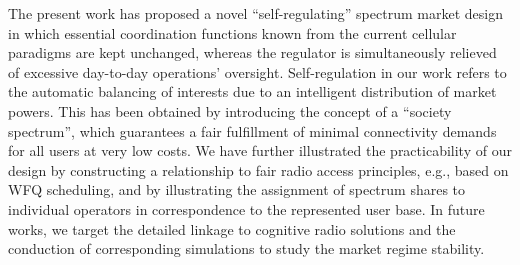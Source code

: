 \documentclass[conference]{IEEEtran}
\begin{document}
The present work has proposed a novel ``self-regulating'' spectrum market design in which essential coordination functions known from the current cellular paradigms are kept unchanged, whereas the regulator is simultaneously relieved of excessive day-to-day operations' oversight. Self-regulation in our work refers to the automatic balancing of interests due to an intelligent distribution of market powers. This has been obtained by introducing the concept of a ``society spectrum'', which guarantees a fair fulfillment of minimal connectivity demands for all users at very low costs. We have further illustrated the practicability of our design by constructing a relationship to fair radio access principles, e.g., based on WFQ scheduling, and by illustrating the assignment of spectrum shares to individual operators in correspondence to the represented user base. In future works, we target the detailed linkage to cognitive radio solutions and the conduction of corresponding simulations to study the market regime stability.









    
\balance
 
\end{document}
